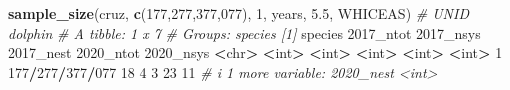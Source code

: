 \documentclass[
]{book}
\newenvironment{Shaded}{\begin{snugshade}}{\end{snugshade}}
\newcommand{\AttributeTok}[1]{\textcolor[rgb]{0.13,0.29,0.53}{#1}}
\newcommand{\CommentTok}[1]{\textcolor[rgb]{0.56,0.35,0.01}{\textit{#1}}}
\newcommand{\DecValTok}[1]{\textcolor[rgb]{0.00,0.00,0.81}{#1}}
\newcommand{\ErrorTok}[1]{\textcolor[rgb]{0.64,0.00,0.00}{\textbf{#1}}}
\newcommand{\FloatTok}[1]{\textcolor[rgb]{0.00,0.00,0.81}{#1}}
\newcommand{\FunctionTok}[1]{\textcolor[rgb]{0.13,0.29,0.53}{\textbf{#1}}}
\newcommand{\NormalTok}[1]{#1}
\newcommand{\SpecialCharTok}[1]{\textcolor[rgb]{0.81,0.36,0.00}{\textbf{#1}}}
\newcommand{\StringTok}[1]{\textcolor[rgb]{0.31,0.60,0.02}{#1}}
\begin{document}
\begin{Shaded}
\begin{Highlighting}[]
\FunctionTok{sample\_size}\NormalTok{(cruz, }\FunctionTok{c}\NormalTok{(}\StringTok{\textquotesingle{}177\textquotesingle{}}\NormalTok{,}\StringTok{\textquotesingle{}277\textquotesingle{}}\NormalTok{,}\StringTok{\textquotesingle{}377\textquotesingle{}}\NormalTok{,}\StringTok{\textquotesingle{}077\textquotesingle{}}\NormalTok{), }
            \DecValTok{1}\NormalTok{, years, }\FloatTok{5.5}\NormalTok{, }\StringTok{\textquotesingle{}WHICEAS\textquotesingle{}}\NormalTok{) }\CommentTok{\# UNID dolphin}
\CommentTok{\# A tibble: 1 x 7}
\CommentTok{\# Groups:   species [1]}
\NormalTok{  species         }\StringTok{\textasciigrave{}}\AttributeTok{2017\_ntot}\StringTok{\textasciigrave{}} \StringTok{\textasciigrave{}}\AttributeTok{2017\_nsys}\StringTok{\textasciigrave{}} \StringTok{\textasciigrave{}}\AttributeTok{2017\_nest}\StringTok{\textasciigrave{}} \StringTok{\textasciigrave{}}\AttributeTok{2020\_ntot}\StringTok{\textasciigrave{}} \StringTok{\textasciigrave{}}\AttributeTok{2020\_nsys}\StringTok{\textasciigrave{}}
  \SpecialCharTok{\textless{}}\NormalTok{chr}\SpecialCharTok{\textgreater{}}                 \ErrorTok{\textless{}}\NormalTok{int}\SpecialCharTok{\textgreater{}}       \ErrorTok{\textless{}}\NormalTok{int}\SpecialCharTok{\textgreater{}}       \ErrorTok{\textless{}}\NormalTok{int}\SpecialCharTok{\textgreater{}}       \ErrorTok{\textless{}}\NormalTok{int}\SpecialCharTok{\textgreater{}}       \ErrorTok{\textless{}}\NormalTok{int}\SpecialCharTok{\textgreater{}}
\DecValTok{1} \DecValTok{177}\SpecialCharTok{/}\DecValTok{277}\SpecialCharTok{/}\DecValTok{377}\SpecialCharTok{/}\DecValTok{077}          \DecValTok{18}           \DecValTok{4}           \DecValTok{3}          \DecValTok{23}          \DecValTok{11}
\CommentTok{\# i 1 more variable: \textasciigrave{}2020\_nest\textasciigrave{} \textless{}int\textgreater{}}


\end{Highlighting}
\end{Shaded}
\end{document}
